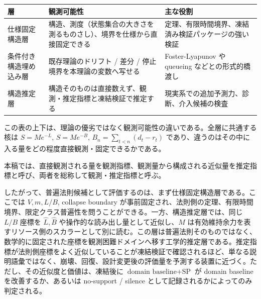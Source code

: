 \documentclass[12pt,a4paper]{article}
\begin{document}
{\def\LTcaptype{table} %
\begin{longtable}[]{@{}
  >{\raggedright\arraybackslash}p{}
  >{\raggedright\arraybackslash}p{}
  >{\raggedright\arraybackslash}p{}@{}}
\toprule\noalign{}
\begin{minipage}[b]{\linewidth}\raggedright
層
\end{minipage} & \begin{minipage}[b]{\linewidth}\raggedright
観測可能性
\end{minipage} & \begin{minipage}[b]{\linewidth}\raggedright
主な役割
\end{minipage} \\
\midrule\noalign{}
\endhead
\bottomrule\noalign{}
\endlastfoot
仕様固定構造層 & 構造、測度（状態集合の大きさを測るものさし）、境界を仕様から直接固定できる & 定理、有限時間境界、凍結済み検証パッケージの強い検証 \\
条件付き構造埋め込み層 & 既存理論のドリフト / 差分 / 停止境界を本理論の変数へ写せる & Foster-Lyapunov や queueing などとの形式的橋渡し \\
構造推定層 & 構造そのものは直接数えず、観測・推定指標と凍結検証で推定する & 現実系での追加予測力、診断、介入候補の検査 \\
\end{longtable}
}

この表の上下は、理論の優劣ではなく観測可能性の違いである。全層に共通する核は \(S=Me^{-L}\), \(S=Me^{-B}\), \(B_{n}=\sum_{t<n}(d_{t}-r_{t})\) であり、違うのはその中に入る量をどの程度直接観測・固定できるかである。

本稿では、直接観測される量を観測指標、観測量から構成される近似量を推定指標と呼び、両者を総称して観測・推定指標と呼ぶ。

したがって、普遍法則候補として評価するのは、まず仕様固定構造層である。ここでは \(V,m,L/B\), collapse boundary が事前固定され、法則側の定理、有限時間境界、限定クラス普遍性を問うことができる。一方、構造推定層では、同じ \(L/B\) 座標を \(\hat L,\hat B\) や操作的な読み出し量として近似し、\(M\) は有効維持余力を表すリソース側のスカラーとして別に読む。この層は普遍法則そのものではなく、数学的に固定された座標を観測困難ドメインへ移す工学的推定層である。推定指標が法則側座標をよく近似していることが凍結検証で確認されるほど、単なる説明語彙ではなく、崩壊、回復、設計変更後の評価量を予測する装置に近づく。ただし、その近似度と価値は、凍結後に \(\text{domain baseline}+\text{SP}\) が domain baseline を改善するか、あるいは no-support / silence として記録されるかによってのみ判定される。
\end{document}
